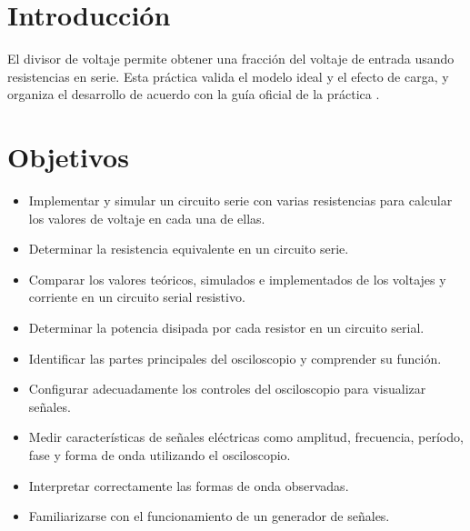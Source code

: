 \documentclass[conference]{IEEEtran}
\title{\titulo}
\author{\IEEEauthorblockN{\autorA\,\IEEEauthorrefmark{1}, \autorB\,\IEEEauthorrefmark{1}}\IEEEauthorblockA{\IEEEauthorrefmark{1}\afiliacion\\ Email: \{\correoA,\,\correoB\}}}
\begin{document}
\maketitle

\begin{abstract}
Se implement\'o y analiz\'o un divisor de voltaje resistivo de cinco elementos, contrastando resultados te\'oricos, simulados (Proteus) y medidos en laboratorio. Primero se verific\'o la relaci\'on ideal de divisi\'on y se cuantific\'o el efecto de carga al considerar la impedancia de medici\'on. Se registraron tensiones, corrientes y potencias por resistencia, y se compararon con los c\'alculos correspondientes. Adem\'as, se resolvi\'o un ejercicio de dise\~no imponiendo particiones de tensi\'on 1/2, 1/4, 1/8 y 1/16 en la cadena, obteniendo relaciones de resistencias 8:4:2:1:1 a partir de $R_1=2.1\,\mathrm{M\Omega}$ y $V_{in}=9\,\mathrm{V}$. Las discrepancias entre metodolog\'ias fueron coherentes con tolerancias de componentes e incertidumbre instrumental.
\end{abstract}


\section{Introducción}
El divisor de voltaje permite obtener una fracción del voltaje de entrada usando resistencias en serie. Esta práctica valida el modelo ideal y el efecto de carga, y organiza el desarrollo de acuerdo con la guía oficial de la práctica \cite{ref:guia}.

\section{Objetivos}
\begin{itemize}
  \item Implementar y simular un circuito serie con varias resistencias para calcular los valores de voltaje en cada una de ellas.
  \item Determinar la resistencia equivalente en un circuito serie.
  \item Comparar los valores te\'oricos, simulados e implementados de los voltajes y corriente en un circuito serial resistivo.
  \item Determinar la potencia disipada por cada resistor en un circuito serial.
  \item Identificar las partes principales del osciloscopio y comprender su funci\'on.
  \item Configurar adecuadamente los controles del osciloscopio para visualizar se\~nales.
  \item Medir caracter\'isticas de se\~nales el\'ectricas como amplitud, frecuencia, per\'iodo, fase y forma de onda utilizando el osciloscopio.
  \item Interpretar correctamente las formas de onda observadas.
  \item Familiarizarse con el funcionamiento de un generador de se\~nales.
\end{itemize}
\end{document}
